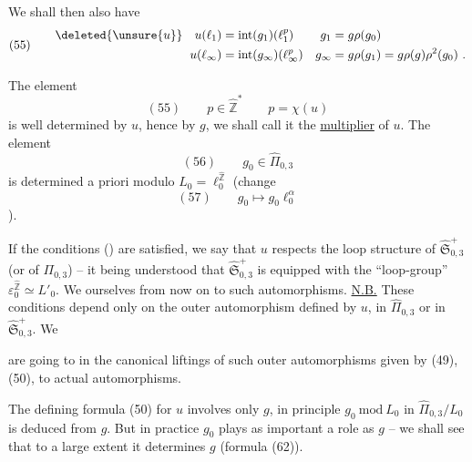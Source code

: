 We shall then also have
\[
(55)\qquad
\begin{aligned}
\deleted{\unsure{u}}\quad u(\ell_1)&=\operatorname{int}(g_1)(\ell_1^p)&
g_1&=g\rho(g_0)\\
u(\ell_\infty)&=\operatorname{int}(g_\infty)(\ell_\infty^p)&
g_\infty&=g\rho(g_1)=g\rho(g)\rho^2(g_0)\ .
\end{aligned}
\]

The element 
\[
(55)\qquad p\in\widehat{\mathbb Z}^{\ast}\qquad p=\chi(u)
\]
is well determined by $u$, hence by $g$, we shall call it the \uline{multiplier} of $u$. The element 
\[
(56)\qquad g_0\in\widehat{\Pi}_{0,3}
\]
is determined a priori modulo $L_0=\ell_0^{\widehat{\mathbb Z}}$ (change
\[
(57)\qquad g_0\longmapsto g_0\ell_0^\alpha
\]
).


If the  conditions () are satisfied, we say that $u$ respects the loop structure of $\widehat{\mathfrak S}_{0,3}^{+}$ (or of $\Pi_{0,3}$) -- it being understood that $\widehat{\mathfrak S}_{0,3}^{+}$ is equipped with the ``loop-group'' $\varepsilon_0^{\widehat{\mathbb Z}}\simeq L'_0$. We  ourselves from now on to such automorphisms. \uline{N.B.} These conditions depend only on the outer automorphism defined by $u$, in $\widehat{\Pi}_{0,3}$ or in $\widehat{\mathfrak S}_{0,3}^{+}$. We


are going to  in the canonical liftings of such outer automorphisms given by (49), (50), to actual automorphisms.

The defining formula (50) for $u$ involves only $g$, in principle $g_0\ \mathrm{mod}\ L_0$ in $\widehat{\Pi}_{0,3}/L_0$ is deduced from $g$. But in practice $g_0$ plays as important a role as $g$ -- we shall see that to a large extent it determines $g$ (formula (62)).

